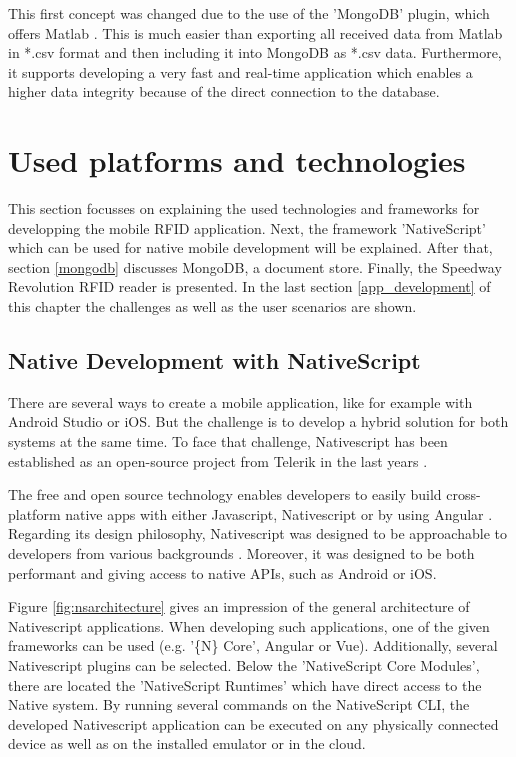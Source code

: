 This first concept was changed due to the use of the 'MongoDB' plugin, which offers Matlab \cite{matlab_mongodb}. This is much easier than exporting all received data from Matlab in *.csv format and then including it into MongoDB as *.csv data. Furthermore, it supports developing a very fast and real-time application which enables a higher data integrity because of the direct connection to the database.  

\section{Used platforms and technologies} \label{platforms}

This section focusses on explaining the used technologies and frameworks for developping the mobile RFID application. Next, the framework 'NativeScript' which can be used for native mobile development will be explained. After that, section \ref{mongodb} discusses MongoDB, a document store. Finally, the Speedway Revolution RFID reader is presented. In the last section \ref{app_development} of this chapter the challenges as well as the user scenarios are shown. 

\subsection{Native Development with NativeScript} 

There are several ways to create a mobile application, like for example with Android Studio or iOS. But the challenge is to develop a hybrid solution for both systems at the same time.
To face that challenge, Nativescript has been established as an open-source project from Telerik in the last years \cite{nativescript}. 

The free and open source technology enables developers to easily build cross-platform native apps with either Javascript, Nativescript or by using Angular \cite{nativescript}. 
Regarding its design philosophy, Nativescript was designed to be approachable to developers from various backgrounds \cite{nativescript}. Moreover, it was designed to be both performant and giving access to native APIs, such as Android or iOS.

Figure \ref{fig:nsarchitecture} gives an impression of the general architecture of Nativescript applications. When developing such applications, one of the given frameworks can be used (e.g. '\{N\} Core', Angular or Vue). Additionally, several Nativescript plugins can be selected. Below the 'NativeScript Core Modules', there are located the 'NativeScript Runtimes' which have direct access to the Native system. By running several commands on the NativeScript \ac{CLI}, the developed Nativescript application can be executed on any physically connected device as well as on the installed emulator or in the cloud. 

